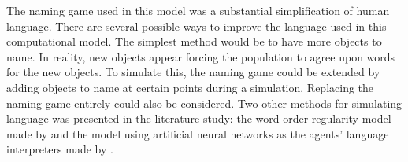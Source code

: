 The naming game used in this model was a substantial simplification of human language. There are several possible ways to improve the language used in this computational model. The simplest method would be to have more objects to name. In reality, new objects appear forcing the population to agree upon words for the new objects. To simulate this, the naming game could be extended by adding objects to name at certain points during a simulation. Replacing the naming game entirely could also be considered. Two other methods for simulating language was presented in the literature study: the word order regularity model made by \citet{gong2004computational} and the model using artificial neural networks as the agents’ language interpreters made by \citet{munroe2002learning}.


\begin{comment}
    \section{Research Questions}
    The research questions of this thesis are:
    
    \begin{centering}
        \begin{enumerate}
            \item How are the state-of-art computational models in the field of simulating language designed and what are their strengths and weaknesses?
            \item How can one state-of-the-art computational model be extended in order to learn more about how the evolutionary forces affect language evolution?
            \item How does social networks have an impact on language evolution? 
        \end{enumerate}
    \end{centering}
\end{comment}